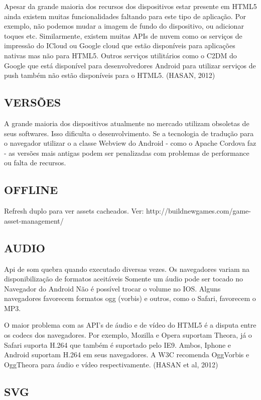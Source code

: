 \documentclass[
12pt,
a4paper,
portuges,
draft
]{report}
\begin{document}
Apesar da grande maioria dos recursos dos dispositivos estar presente
em HTML5 ainda existem muitas funcionalidades faltando para este tipo
de aplicação. Por exemplo, não podemos mudar a imagem de fundo do
dispositivo, ou adicionar toques etc. Similarmente, existem muitas
APIs de nuvem como os serviços de impressão do ICloud ou Google
cloud que estão disponíveis para aplicações nativas mas não para
HTML5. Outros serviços utilitários como o C2DM do Google que está
disponível para desenvolvedores Android para utilizar serviços de push
também não estão disponíveis para o HTML5. (HASAN, 2012)

\subsection{VERSÕES}
A grande maioria dos dispositivos atualmente no mercado utilizam
obsoletas de seus softwares. Isso dificulta o desenvolvimento. Se a
tecnologia de tradução para o navegador utilizar o a classe Webview do
Android - como o Apache Cordova faz - as versões mais antigas podem ser
penalizadas com problemas de performance ou falta de recursos.

\subsection{OFFLINE}

Refresh duplo para ver assets cacheados. Ver:
http://buildnewgames.com/game-asset-management/

\subsection{AUDIO}
Api de som quebra quando executado diversas vezes.
Os navegadores variam na disponibilização de formatos aceitáveis
Somente um áudio pode ser tocado no Navegador do Android
Não é possível trocar o volume no IOS.
Alguns navegadores favorecem formatos ogg (vorbis) e outros, como o
Safari, favorecem o MP3.

O maior problema com as API's de áudio e de vídeo do HTML5 é
a disputa entre os codecs dos navegadores. Por exemplo, Mozilla e
Opera suportam Theora, já o Safari suporta H.264 que também é
suportado pelo IE9. Ambos, Iphone e Android suportam H.264 em seus
navegadores. A W3C recomenda OggVorbis e OggTheora para áudio e vídeo
respectivamente. (HASAN et al, 2012)

\subsection{SVG}
\end{document}
